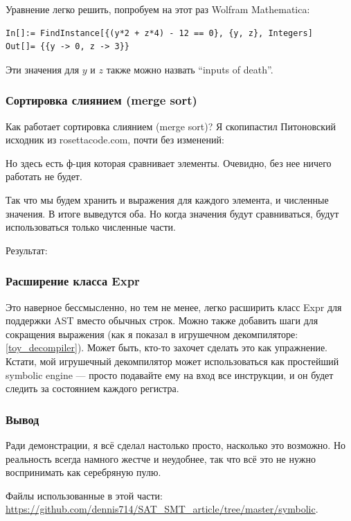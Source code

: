 Уравнение легко решить, попробуем на этот раз Wolfram Mathematica:

\begin{lstlisting}
In[]:= FindInstance[{(y*2 + z*4) - 12 == 0}, {y, z}, Integers]
Out[]= {{y -> 0, z -> 3}}
\end{lstlisting}

Эти значения для $y$ и $z$ также можно назвать ``inputs of death''.

\subsubsection{Сортировка слиянием (merge sort)}

Как работает сортировка слиянием (merge sort)?
Я скопипастил Питоновский исходник из rosettacode.com, почти без изменений:



Но здесь есть ф-ция которая сравнивает элементы.
Очевидно, без нее ничего работать не будет.

Так что мы будем хранить и выражения для каждого элемента, и численные значения.
В итоге выведутся оба.
Но когда значения будут сравниваться, будут использоваться только численные части.

Результат:



\subsubsection{Расширение класса Expr}

Это наверное бессмысленно, но тем не менее, легко расширить класс Expr для поддержки \ac{AST} вместо обычных строк.
Можно также добавить шаги для сокращения выражения (как я показал в игрушечном декомпиляторе: \ref{toy_decompiler}).
Может быть, кто-то захочет сделать это как упражнение.
Кстати, мой игрушечный декомпилятор может использоваться как простейший symbolic engine --- просто подавайте ему на вход
все инструкции, и он будет следить за состоянием каждого регистра.

\subsubsection{Вывод}

Ради демонстрации, я всё сделал настолько просто, насколько это возможно.
Но реальность всегда намного жестче и неудобнее, так что всё это не нужно воспринимать как серебряную пулю.

Файлы использованные в этой части: \url{https://github.com/dennis714/SAT_SMT_article/tree/master/symbolic}.

